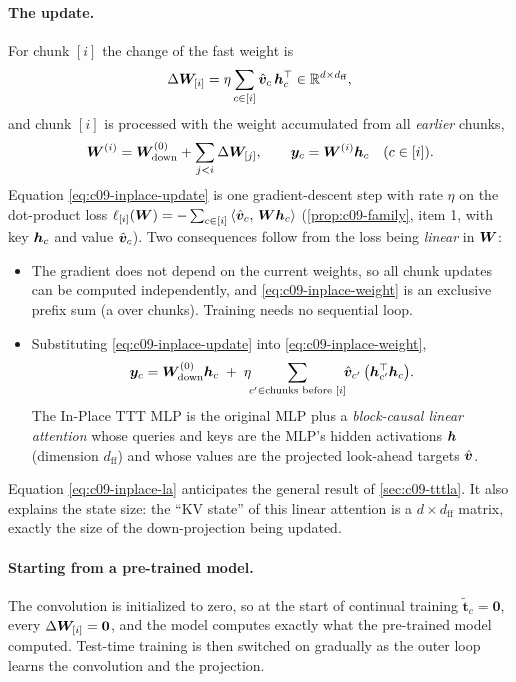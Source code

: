 \paragraph{The update.} For chunk $[i]$ the change of the fast weight is
\begin{equation}\label{eq:c09-inplace-update}
  \Delta\bm{W}_{[i]} = \eta \sum_{c\in[i]} \hat{\bm{v}}_c\,\bm{h}_c^{\top} \in \mathbb{R}^{d\times d_{\text{ff}}},
\end{equation}
and chunk $[i]$ is processed with the weight accumulated from all \emph{earlier} chunks,
\begin{equation}\label{eq:c09-inplace-weight}
  \bm{W}^{(i)} = \bm{W}_{\text{down}}^{(0)} + \sum_{j<i}\Delta\bm{W}_{[j]}, \qquad
  \bm{y}_c = \bm{W}^{(i)}\bm{h}_c \quad (c \in [i]).
\end{equation}
Equation \eqref{eq:c09-inplace-update} is one gradient-descent step with rate $\eta$ on the
dot-product loss $\ell_{[i]}(\bm{W}) = -\sum_{c\in[i]}\left\langle \hat{\bm{v}}_c,\, \bm{W}\bm{h}_c\right\rangle$
(\cref{prop:c09-family}, item 1, with key $\bm{h}_c$ and value $\hat{\bm{v}}_c$). Two consequences
follow from the loss being \emph{linear} in $\bm{W}$:
\begin{itemize}
  \item The gradient does not depend on the current weights, so all chunk updates can be
        computed independently, and \eqref{eq:c09-inplace-weight} is an exclusive prefix sum
        (a  over chunks). Training needs no sequential loop.
  \item Substituting \eqref{eq:c09-inplace-update} into \eqref{eq:c09-inplace-weight},
\begin{equation}\label{eq:c09-inplace-la}
  \bm{y}_c = \bm{W}_{\text{down}}^{(0)}\bm{h}_c \;+\; \eta\!\!\sum_{c' \in \text{chunks before } [i]}\!\!
          \hat{\bm{v}}_{c'}\,\big(\bm{h}_{c'}^{\top}\bm{h}_c\big).
\end{equation}
        The In-Place TTT MLP is the original MLP plus a \emph{block-causal linear attention}
        whose queries and keys are the MLP's hidden activations $\bm{h}$ (dimension
        $d_{\text{ff}}$) and whose values are the projected look-ahead targets $\hat{\bm{v}}$.
\end{itemize}
Equation \eqref{eq:c09-inplace-la} anticipates the general result of \cref{sec:c09-tttla}. It
also explains the state size: the ``KV state'' of this linear attention is a
$d\times d_{\text{ff}}$ matrix, exactly the size of the down-projection being updated.

\paragraph{Starting from a pre-trained model.} The convolution is initialized to zero, so at the
start of continual training $\tilde{\bm{t}}_c = \bm{0}$, every $\Delta\bm{W}_{[i]} = \bm{0}$, and the
model computes exactly what the pre-trained model computed. Test-time training is then switched
on gradually as the outer loop learns the convolution and the projection.

